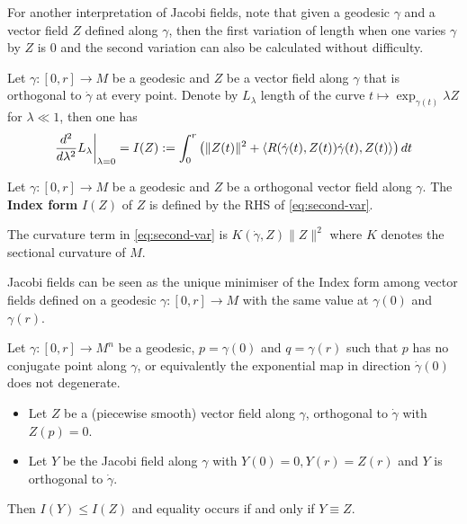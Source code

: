 \documentclass[11pt]{article}
\begin{document}
For another interpretation of Jacobi fields, note that given a geodesic \(\gamma\) and a
vector field \(Z\) defined along \(\gamma\), then the first variation of length when
one varies \(\gamma\) by \(Z\) is 0 and the second variation can also be calculated
without difficulty.

\begin{proposition}
\label{prop:index-form-variation}
Let \(\gamma:[0,r] \longrightarrow M\) be a geodesic and \(Z\) be a vector field along \(\gamma\) that is
orthogonal to \(\dot\gamma\) at every point. Denote by \(L_\lambda\) length of the
curve \(t\mapsto \exp_{\gamma(t)}\lambda Z\) for \(\lambda \ll 1\), then one has
\begin{equation}
\label{eq:second-var}
 \restr{\frac{d^2}{d\lambda^2}L_\lambda}{\lambda = 0} = I(Z):=   \int_0^r \left( \|Z(t)\|^2 + \langle R(\dot\gamma(t), Z(t))\dot\gamma(t), Z(t) \rangle \right) dt
\end{equation}
\end{proposition}

\begin{definition}
Let \(\gamma:[0,r] \longrightarrow M\) be a geodesic and \(Z\) be a orthogonal vector
field along \(\gamma\). The \textbf{Index form} \(I(Z)\) of \(Z\) is defined by the RHS of \eqref{eq:second-var}.
\end{definition}

\begin{remark}
The curvature term in \eqref{eq:second-var} is \(K(\dot\gamma,Z)\|Z\|^2\) where \(K\) denotes the
sectional curvature of \(M\).
\end{remark}

Jacobi fields can be seen as the unique minimiser of the Index form among vector fields
defined on a geodesic \(\gamma:[0,r] \longrightarrow M\) with the same value at \(\gamma(0)\) and \(\gamma(r)\).

\begin{theorem}
\label{thm:index-ineq}
Let \(\gamma: [0,r] \longrightarrow M^n\) be a geodesic, \(p=\gamma(0)\) and \(q=\gamma(r)\) such that \(p\) has no conjugate point along \(\gamma\), or
equivalently the exponential map in direction \(\dot\gamma(0)\) does not degenerate.
\begin{itemize}
\item Let \(Z\) be a (piecewise smooth) vector field along \(\gamma\), orthogonal to \(\dot\gamma\) with \(Z(p)=0\).
\item Let \(Y\) be the Jacobi field along \(\gamma\) with \(Y(0) = 0, Y(r) = Z(r)\) and
\(Y\) is orthogonal to \(\dot\gamma\).
\end{itemize}
Then \(I(Y) \leq I(Z)\) and equality occurs if and only if \(Y\equiv Z\).
\end{theorem}
\end{document}
